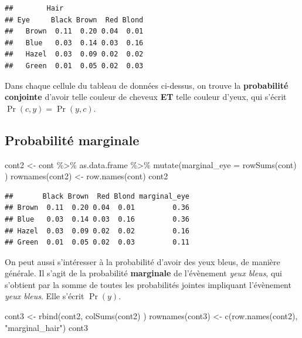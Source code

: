 \documentclass[
  a4paper,11pt,twoside,onecolumn,openright,final,oldfontcommands]{memoir}
\newenvironment{Shaded}{\begin{snugshade}}{\end{snugshade}}
\newcommand{\AttributeTok}[1]{\textcolor[rgb]{0.77,0.63,0.00}{#1}}
\newcommand{\FunctionTok}[1]{\textcolor[rgb]{0.00,0.00,0.00}{#1}}
\newcommand{\NormalTok}[1]{#1}
\newcommand{\OtherTok}[1]{\textcolor[rgb]{0.56,0.35,0.01}{#1}}
\newcommand{\SpecialCharTok}[1]{\textcolor[rgb]{0.00,0.00,0.00}{#1}}
\newcommand{\StringTok}[1]{\textcolor[rgb]{0.31,0.60,0.02}{#1}}
\theoremstyle{definition}
\theoremstyle{definition}
\theoremstyle{definition}
\theoremstyle{definition}
\theoremstyle{remark}
\begin{document}
\begin{verbatim}
##        Hair
## Eye     Black Brown  Red Blond
##   Brown  0.11  0.20 0.04  0.01
##   Blue   0.03  0.14 0.03  0.16
##   Hazel  0.03  0.09 0.02  0.02
##   Green  0.01  0.05 0.02  0.03
\end{verbatim}

Dans chaque cellule du tableau de données ci-dessus, on trouve la \textbf{probabilité conjointe} d'avoir telle couleur de cheveux \textbf{ET} telle couleur d'yeux, qui s'écrit \(\Pr(c, y) = \Pr(y, c)\).

\hypertarget{probabilituxe9-marginale}{%
\subsection{Probabilité marginale}\label{probabilituxe9-marginale}}

\begin{Shaded}
\begin{Highlighting}[]
\NormalTok{cont2 }\OtherTok{\textless{}{-}}\NormalTok{ cont }\SpecialCharTok{\%\textgreater{}\%}\NormalTok{ as.data.frame }\SpecialCharTok{\%\textgreater{}\%} \FunctionTok{mutate}\NormalTok{(}\AttributeTok{marginal\_eye =} \FunctionTok{rowSums}\NormalTok{(cont) )}
\FunctionTok{rownames}\NormalTok{(cont2) }\OtherTok{\textless{}{-}} \FunctionTok{row.names}\NormalTok{(cont)}
\NormalTok{cont2}
\end{Highlighting}
\end{Shaded}

\begin{verbatim}
##       Black Brown  Red Blond marginal_eye
## Brown  0.11  0.20 0.04  0.01         0.36
## Blue   0.03  0.14 0.03  0.16         0.36
## Hazel  0.03  0.09 0.02  0.02         0.16
## Green  0.01  0.05 0.02  0.03         0.11
\end{verbatim}

On peut aussi s'intéresser à la probabilité d'avoir des yeux bleus, de manière générale. Il s'agit de la probabilité \textbf{marginale} de l'évènement \emph{yeux bleus}, qui s'obtient par la somme de toutes les probabilités jointes impliquant l'évènement \emph{yeux bleus}. Elle s'écrit \(\Pr(y)\).

\begin{Shaded}
\begin{Highlighting}[]
\NormalTok{cont3 }\OtherTok{\textless{}{-}} \FunctionTok{rbind}\NormalTok{(cont2, }\FunctionTok{colSums}\NormalTok{(cont2) )}
\FunctionTok{rownames}\NormalTok{(cont3) }\OtherTok{\textless{}{-}} \FunctionTok{c}\NormalTok{(}\FunctionTok{row.names}\NormalTok{(cont2), }\StringTok{"marginal\_hair"}\NormalTok{)}
\NormalTok{cont3}
\end{Highlighting}
\end{Shaded}
\end{document}
